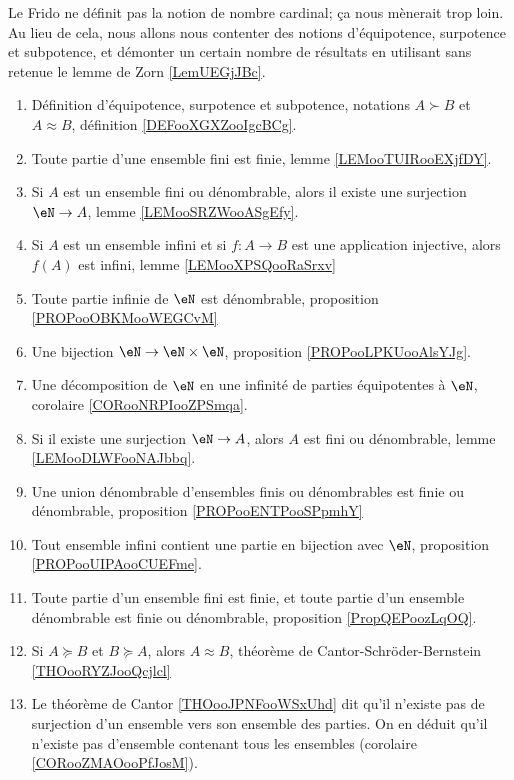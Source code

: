 Le Frido ne définit pas la notion de nombre cardinal; ça nous mènerait trop loin. Au lieu de cela, nous allons nous contenter des notions d'équipotence, surpotence et subpotence, et démonter un certain nombre de résultats en utilisant sans retenue le lemme de Zorn \ref{LemUEGjJBc}.
\begin{enumerate}
    \item
        Définition d'équipotence, surpotence et subpotence, notations \( A\succ B\) et \( A\approx B\), définition \ref{DEFooXGXZooIgcBCg}.
    \item
    Toute partie d'une ensemble fini est finie, lemme \ref{LEMooTUIRooEXjfDY}.
\item
Si \( A\) est un ensemble fini ou dénombrable, alors il existe une surjection \( \eN\to A\), lemme \ref{LEMooSRZWooASgEfy}.
\item
    Si \( A\) est un ensemble infini et si \( f\colon A\to B\) est une application injective, alors \( f(A)\) est infini, lemme \ref{LEMooXPSQooRaSrxv}
\item
    Toute partie infinie de \( \eN\) est dénombrable, proposition \ref{PROPooOBKMooWEGCvM}
\item
    Une bijection \( \eN\to \eN\times \eN\), proposition \ref{PROPooLPKUooAlsYJg}.
\item
    Une décomposition de \( \eN\) en une infinité de parties équipotentes à \( \eN\), corolaire \ref{CORooNRPIooZPSmqa}.
\item
    Si il existe une surjection \( \eN\to A\), alors \( A\) est fini ou dénombrable, lemme \ref{LEMooDLWFooNAJbbq}.
\item
    Une union dénombrable d'ensembles finis ou dénombrables est finie ou dénombrable, proposition \ref{PROPooENTPooSPpmhY}
\item
    Tout ensemble infini contient une partie en bijection avec \( \eN\), proposition \ref{PROPooUIPAooCUEFme}.
\item
    Toute partie d'un ensemble fini est finie, et toute partie d'un ensemble dénombrable est finie ou dénombrable, proposition \ref{PropQEPoozLqOQ}.
\item
    Si \( A\succeq B\) et \( B\succeq A\), alors \( A\approx B\), théorème de Cantor-Schröder-Bernstein \ref{THOooRYZJooQcjlcl}
\item
    Le théorème de Cantor \ref{THOooJPNFooWSxUhd} dit qu'il n'existe pas de surjection d'un ensemble vers son ensemble des parties. On en déduit qu'il n'existe pas d'ensemble contenant tous les ensembles (corolaire \ref{CORooZMAOooPfJosM}).

\end{enumerate}

